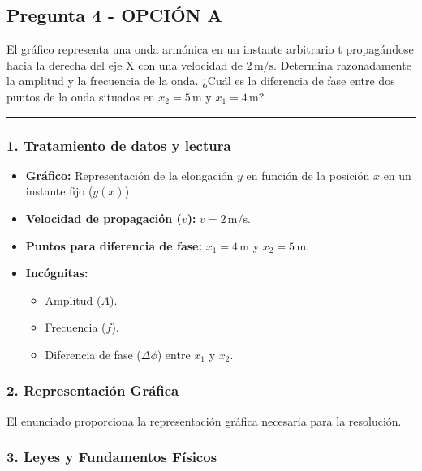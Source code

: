 \subsection{Pregunta 4 - OPCIÓN A}
\label{subsec:4A_2019_jul_ext}

\begin{cajaenunciado}
El gráfico representa una onda armónica en un instante arbitrario t propagándose hacia la derecha del eje X con una velocidad de $2\,\text{m/s}$. Determina razonadamente la amplitud y la frecuencia de la onda. ¿Cuál es la diferencia de fase entre dos puntos de la onda situados en $x_2=5\,\text{m}$ y $x_1=4\,\text{m}$?
\end{cajaenunciado}
\hrule

\subsubsection*{1. Tratamiento de datos y lectura}
\begin{itemize}
    \item \textbf{Gráfico:} Representación de la elongación $y$ en función de la posición $x$ en un instante fijo ($y(x)$).
    \item \textbf{Velocidad de propagación ($v$):} $v = 2 \, \text{m/s}$.
    \item \textbf{Puntos para diferencia de fase:} $x_1 = 4 \, \text{m}$ y $x_2 = 5 \, \text{m}$.
    \item \textbf{Incógnitas:}
    \begin{itemize}
        \item Amplitud ($A$).
        \item Frecuencia ($f$).
        \item Diferencia de fase ($\Delta\phi$) entre $x_1$ y $x_2$.
    \end{itemize}
\end{itemize}

\subsubsection*{2. Representación Gráfica}
El enunciado proporciona la representación gráfica necesaria para la resolución.

\subsubsection*{3. Leyes y Fundamentos Físicos}
